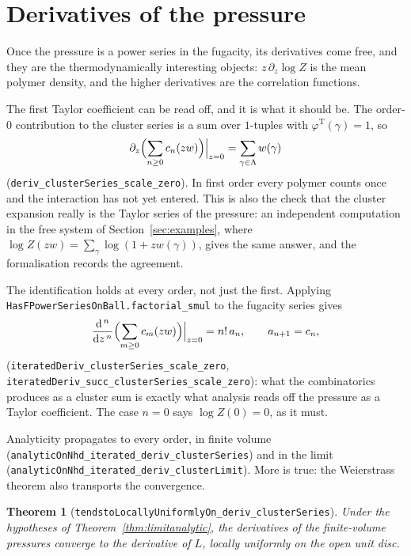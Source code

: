 \documentclass[11pt]{amsart}
\newtheorem{theorem}{Theorem}[section]
\begin{document}
\section{Derivatives of the pressure}\label{sec:corr}

Once the pressure is a power series in the fugacity, its derivatives come
free, and they are the thermodynamically interesting objects:
$z\,\partial_z \log Z$ is the mean polymer density, and the higher
derivatives are the correlation functions.

The first Taylor coefficient can be read off, and it is what it should
be. The order-$0$ contribution to the cluster series is a sum over
$1$-tuples with $\varphi^{\mathrm T}(\gamma) = 1$, so
\[
  \partial_z \Bigl(\sum_{n \ge 0} c_n(zw)\Bigr)\Big|_{z = 0}
  = \sum_{\gamma \in \Lambda} w(\gamma)
\]
(\texttt{deriv\_clusterSeries\_scale\_zero}). In first order every
polymer counts once and the interaction has not yet entered. This is
also the check that the cluster expansion really is the Taylor series of
the pressure: an independent computation in the free system of
Section~\ref{sec:examples}, where $\log Z(zw) = \sum_\gamma \log(1 + z
w(\gamma))$, gives the same answer, and the formalisation records the
agreement.

The identification holds at every order, not just the first. Applying
\texttt{HasFPowerSeriesOnBall.factorial\_smul} to the fugacity series
gives
\[
  \frac{\mathrm d^{\,n}}{\mathrm d z^{\,n}}
    \Bigl(\sum_{m \ge 0} c_m(zw)\Bigr)\Big|_{z=0}
  = n!\, a_n ,
  \qquad a_{n+1} = c_n ,
\]
(\texttt{iteratedDeriv\_clusterSeries\_scale\_zero},
\texttt{iteratedDeriv\_succ\_clusterSeries\_scale\_zero}): what the
combinatorics produces as a cluster sum is exactly what analysis reads
off the pressure as a Taylor coefficient. The case $n = 0$ says
$\log Z(0) = 0$, as it must.

Analyticity propagates to every order, in finite volume
(\texttt{analyticOnNhd\_iterated\_deriv\_clusterSeries}) and in the limit
(\texttt{analyticOnNhd\_iterated\_deriv\_clusterLimit}). More is true:
the Weierstrass theorem also transports the convergence.

\begin{theorem}[\texttt{tendstoLocallyUniformlyOn\_deriv\_clusterSeries}]\label{thm:corr}
Under the hypotheses of Theorem~\ref{thm:limitanalytic}, the derivatives
of the finite-volume pressures converge to the derivative of $L$, locally
uniformly on the open unit disc.
\end{theorem}
\end{document}
